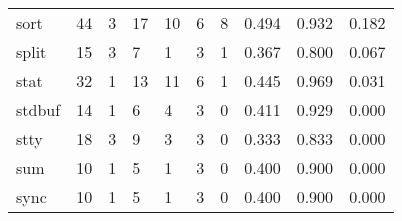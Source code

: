 \begin{longtable}{lp{1.3cm}p{1.3cm}p{1.3cm}p{1.3cm}p{1.3cm}p{1.3cm}p{1.3cm}p{1.3cm}p{1.3cm}}
sort      &                     44 &                                             3 &                                           17 &                                          10 &                                            6 &                                          8 &                                0.494 &                                  0.932 &                                0.182 \\
split     &                     15 &                                             3 &                                            7 &                                           1 &                                            3 &                                          1 &                                0.367 &                                  0.800 &                                0.067 \\
stat      &                     32 &                                             1 &                                           13 &                                          11 &                                            6 &                                          1 &                                0.445 &                                  0.969 &                                0.031 \\
stdbuf    &                     14 &                                             1 &                                            6 &                                           4 &                                            3 &                                          0 &                                0.411 &                                  0.929 &                                0.000 \\
stty      &                     18 &                                             3 &                                            9 &                                           3 &                                            3 &                                          0 &                                0.333 &                                  0.833 &                                0.000 \\
sum       &                     10 &                                             1 &                                            5 &                                           1 &                                            3 &                                          0 &                                0.400 &                                  0.900 &                                0.000 \\
sync      &                     10 &                                             1 &                                            5 &                                           1 &                                            3 &                                          0 &                                0.400 &                                  0.900 &                                0.000 \\

\end{longtable}
